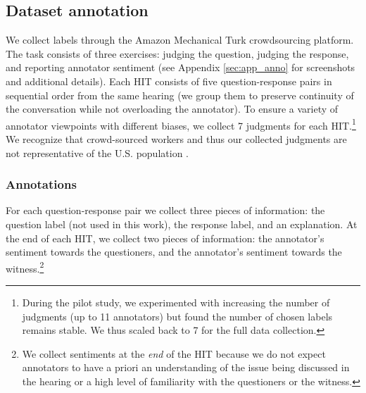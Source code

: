 \subsection{Dataset annotation} 
\label{sec:subj_annotations}
We collect labels through the Amazon Mechanical Turk crowdsourcing platform. The task consists of three exercises: judging the question, judging the response, and reporting annotator sentiment (see Appendix \ref{sec:app_anno} for screenshots and additional details). Each HIT consists of five question-response pairs in sequential order from the same hearing (we group them to preserve continuity of the conversation while not overloading the annotator). To ensure a variety of annotator viewpoints with different biases, we collect 7 judgments for each HIT.\footnote{During the pilot study, we experimented with increasing the number of judgments (up to 11 annotators) but found the number of chosen labels remains stable. We thus scaled back to 7 for the full data collection.} We recognize that crowd-sourced workers and thus our collected judgments are not representative of the U.S. population \cite{Difallah:2018}. 

\subsubsection{Annotations}
For each question-response pair we collect three pieces of information: the question label (not used in this work), the response label, and an explanation. At the end of each HIT, we collect two pieces of information: the annotator's sentiment towards the questioners, and the annotator's sentiment towards the witness.\footnote{We collect sentiments at the \emph{end} of the HIT because we do not expect annotators to have a priori an understanding of the issue being discussed in the hearing or a high level of familiarity with the questioners or the witness.}

